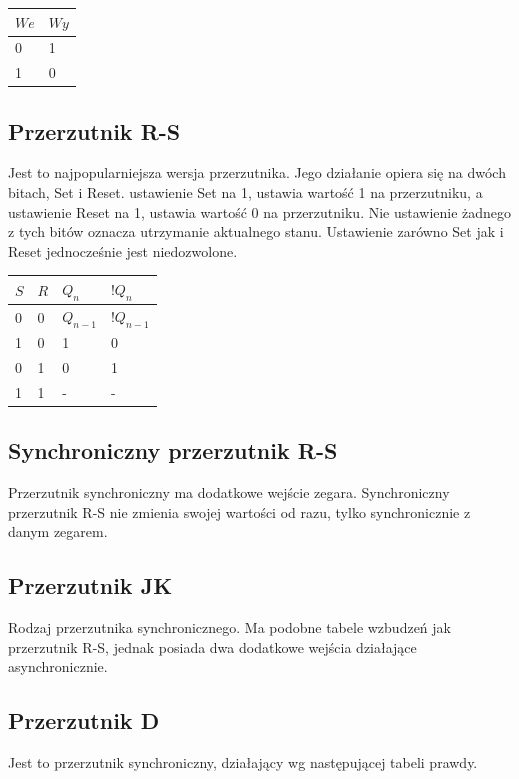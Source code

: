 \documentclass[a4paper,11pt]{article}
\begin{document}
\begin{center}
	\begin{tabular}{|l|l|}\hline
	$We$ & $Wy$ \\ \hline
	0 & 1 \\
	1 & 0 \\ \hline
	\end{tabular}
\end{center}

\subsection{Przerzutnik R-S}
Jest to najpopularniejsza wersja przerzutnika. Jego działanie opiera się na dwóch bitach, Set i Reset. ustawienie Set na 1, ustawia wartość 1 na przerzutniku, a ustawienie Reset na 1, ustawia wartość 0 na przerzutniku. Nie ustawienie żadnego z tych bitów oznacza utrzymanie aktualnego stanu. Ustawienie zarówno Set jak i Reset jednocześnie jest niedozwolone.

\begin{center}
	\begin{tabular}{|l|l|l|l|}\hline
	$S$ & $R$ & $Q_n$ & $!Q_n$ \\ \hline
	0 & 0 & $Q_{n-1}$ & $!Q_{n-1}$ \\
	1 & 0 & 1 & 0 \\
	0 & 1 & 0 & 1 \\
	1 & 1 & - & - \\ \hline
	\end{tabular}
\end{center}


\subsection{Synchroniczny przerzutnik R-S}
Przerzutnik synchroniczny ma dodatkowe wejście zegara. Synchroniczny przerzutnik R-S nie zmienia swojej wartości od razu, tylko synchronicznie z danym zegarem.

\subsection{Przerzutnik JK}
Rodzaj przerzutnika synchronicznego. Ma podobne tabele wzbudzeń jak przerzutnik R-S, jednak posiada dwa dodatkowe wejścia działające asynchronicznie.

\subsection{Przerzutnik D}
Jest to przerzutnik synchroniczny, działający wg następującej tabeli prawdy.
\end{document}
